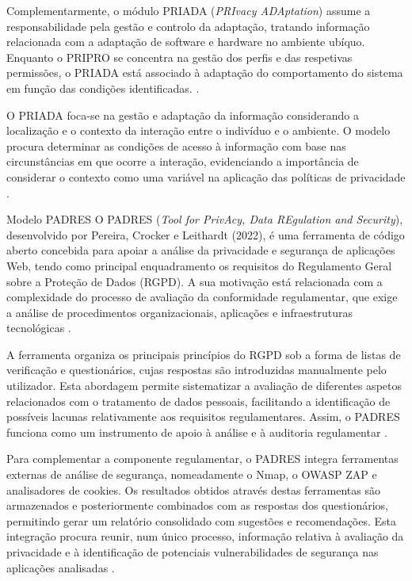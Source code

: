 \documentclass[12pt,reqno, twoside]{amsbook}
\makeatletter
\def\subsection{\@startsection{subsection}{2}%
      \z@{.5\linespacing\@plus.7\linespacing}{.25\linespacing}%
      {\normalfont\bfseries\flushleft}}
\theoremstyle{plain}
\numberwithin{equation}{chapter}
\numberwithin{table}{chapter}
\numberwithin{figure}{chapter}
\numberwithin{section}{chapter}
\makeatother
\begin{document}
Complementarmente, o módulo PRIADA (\textit{PRIvacy ADAptation}) assume a responsabilidade pela gestão e controlo da adaptação, tratando informação relacionada com a adaptação de software e hardware no ambiente ubíquo. Enquanto o PRIPRO se concentra na gestão dos perfis e das respetivas permissões, o PRIADA está associado à adaptação do comportamento do sistema em função das condições identificadas. \cite{prichain2019,cesconetto2020,lopes2020priada}.

O PRIADA foca-se na gestão e adaptação da informação considerando a localização e o contexto da interação entre o indivíduo e o ambiente. O modelo procura determinar as condições de acesso à informação com base nas circunstâncias em que ocorre a interação, evidenciando a importância de considerar o contexto como uma variável na aplicação das políticas de privacidade \cite{lopes2020priada}.

\subsection{Modelo PADRES}
O PADRES (\textit{Tool for PrivAcy, Data REgulation and Security}), desenvolvido por Pereira, Crocker e Leithardt (2022), é uma ferramenta de código aberto concebida para apoiar a análise da privacidade e segurança de aplicações Web, tendo como principal enquadramento os requisitos do Regulamento Geral sobre a Proteção de Dados (RGPD). A sua motivação está relacionada com a complexidade do processo de avaliação da conformidade regulamentar, que exige a análise de procedimentos organizacionais, aplicações e infraestruturas tecnológicas \cite{pereira2022}.

A ferramenta organiza os principais princípios do RGPD sob a forma de listas de verificação e questionários, cujas respostas são introduzidas manualmente pelo utilizador. Esta abordagem permite sistematizar a avaliação de diferentes aspetos relacionados com o tratamento de dados pessoais, facilitando a identificação de possíveis lacunas relativamente aos requisitos regulamentares. Assim, o PADRES funciona como um instrumento de apoio à análise e à auditoria regulamentar \cite{pereira2022}.

Para complementar a componente regulamentar, o PADRES integra ferramentas externas de análise de segurança, nomeadamente o Nmap, o OWASP ZAP e analisadores de cookies. Os resultados obtidos através destas ferramentas são armazenados e posteriormente combinados com as respostas dos questionários, permitindo gerar um relatório consolidado com sugestões e recomendações. Esta integração procura reunir, num único processo, informação relativa à avaliação da privacidade e à identificação de potenciais vulnerabilidades de segurança nas aplicações analisadas \cite{pereira2022}.
\end{document}
